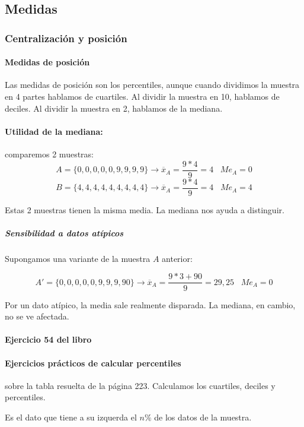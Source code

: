 \subsection{Medidas}

\subsubsection{Centralización y posición}


\paragraph{Medidas de posición}

Las medidas de posición son los percentiles, aunque cuando dividimos la muestra en 4 partes hablamos de cuartiles. Al dividir la muestra en 10, hablamos de deciles. Al dividir la muestra en 2, hablamos de la mediana.



\paragraph{Utilidad de la mediana:} comparemos 2 muestras:
\[A=\{0,0,0,0,0,9,9,9,9\} \to \overline{x}_A = \frac{9*4}{9}=4\;\;\; Me_A = 0\]
\[B=\{4,4,4,4,4,4,4,4,4\} \to \overline{x}_A = \frac{9*4}{9}=4\;\;\; Me_A = 4\]

Estas 2 muestras tienen la misma media. La mediana nos ayuda a distinguir. 

\subparagraph{Sensibilidad a datos atípicos}
Supongamos una variante de la muestra $A$ anterior:

\[A'=\{0,0,0,0,0,9,9,9,90\} \to \overline{x}_A = \frac{9*3+90}{9}=29,25\;\;\; Me_A = 0\]

Por un dato atípico, la media sale realmente disparada. La mediana, en cambio, no se ve afectada.

\paragraph{Ejercicio 54 del libro}

\paragraph{Ejercicios prácticos de calcular percentiles} sobre la tabla resuelta de la página 223. 
%
Calculamos los cuartiles, deciles y percentiles.

\begin{defn}[Percentil n]
Es el dato que tiene a su izquerda el $n\%$ de los datos de la muestra.
\end{defn} 

